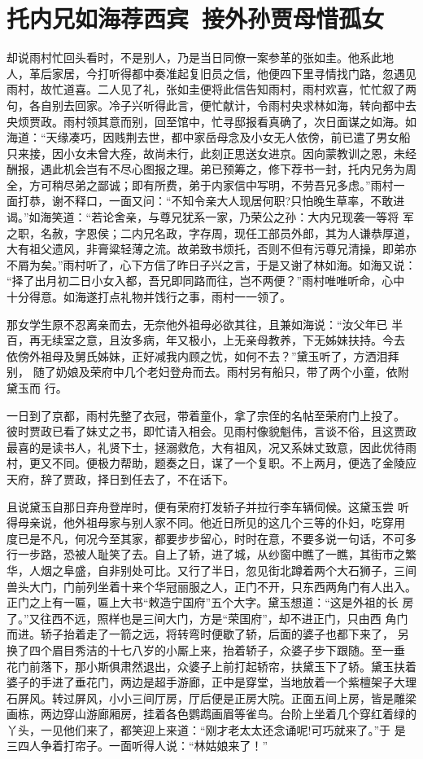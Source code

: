 \chapter{托内兄如海荐西宾~接外孙贾母惜孤女}

却说雨村忙回头看时，不是别人，乃是当日同僚一案参革的张如圭。他系此地
人，革后家居，今打听得都中奏准起复旧员之信，他便四下里寻情找门路，忽遇见
雨村，故忙道喜。二人见了礼，张如圭便将此信告知雨村，雨村欢喜，忙忙叙了两
句，各自别去回家。冷子兴听得此言，便忙献计，令雨村央求林如海，转向都中去
央烦贾政。雨村领其意而别，回至馆中，忙寻邸报看真确了，次日面谋之如海。如
海道：“天缘凑巧，因贱荆去世，都中家岳母念及小女无人依傍，前已遣了男女船
只来接，因小女未曾大痊，故尚未行，此刻正思送女进京。因向蒙教训之恩，未经
酬报，遇此机会岂有不尽心图报之理。弟已预筹之，修下荐书一封，托内兄务为周
全，方可稍尽弟之鄙诚；即有所费，弟于内家信中写明，不劳吾兄多虑。”雨村一
面打恭，谢不释口，一面又问：“不知令亲大人现居何职?只怕晚生草率，不敢进
谒。”如海笑道：“若论舍亲，与尊兄犹系一家，乃荣公之孙：大内兄现袭一等将
军之职，名赦，字恩侯；二内兄名政，字存周，现任工部员外郎，其为人谦恭厚道，
大有祖父遗风，非膏粱轻薄之流。故弟致书烦托，否则不但有污尊兄清操，即弟亦
不屑为矣。”雨村听了，心下方信了昨日子兴之言，于是又谢了林如海。如海又说：
“择了出月初二日小女入都，吾兄即同路而往，岂不两便？”雨村唯唯听命，心中
十分得意。如海遂打点礼物并饯行之事，雨村一一领了。

那女学生原不忍离亲而去，无奈他外祖母必欲其往，且兼如海说：“汝父年已
半百，再无续室之意，且汝多病，年又极小，上无亲母教养，下无姊妹扶持。今去
依傍外祖母及舅氏姊妹，正好减我内顾之忧，如何不去？”黛玉听了，方洒泪拜别，
随了奶娘及荣府中几个老妇登舟而去。雨村另有船只，带了两个小童，依附黛玉而
行。

一日到了京都，雨村先整了衣冠，带着童仆，拿了宗侄的名帖至荣府门上投了。
彼时贾政已看了妹丈之书，即忙请入相会。见雨村像貌魁伟，言谈不俗，且这贾政
最喜的是读书人，礼贤下士，拯溺救危，大有祖风，况又系妹丈致意，因此优待雨
村，更又不同。便极力帮助，题奏之日，谋了一个复职。不上两月，便选了金陵应
天府，辞了贾政，择日到任去了，不在话下。

且说黛玉自那日弃舟登岸时，便有荣府打发轿子并拉行李车辆伺候。这黛玉尝
听得母亲说，他外祖母家与别人家不同。他近日所见的这几个三等的仆妇，吃穿用
度已是不凡，何况今至其家，都要步步留心，时时在意，不要多说一句话，不可多
行一步路，恐被人耻笑了去。自上了轿，进了城，从纱窗中瞧了一瞧，其街市之繁
华，人烟之阜盛，自非别处可比。又行了半日，忽见街北蹲着两个大石狮子，三间
兽头大门，门前列坐着十来个华冠丽服之人，正门不开，只东西两角门有人出入。
正门之上有一匾，匾上大书“敕造宁国府”五个大字。黛玉想道：“这是外祖的长
房了。”又往西不远，照样也是三间大门，方是“荣国府”，却不进正门，只由西
角门而进。轿子抬着走了一箭之远，将转弯时便歇了轿，后面的婆子也都下来了，
另换了四个眉目秀洁的十七八岁的小厮上来，抬着轿子，众婆子步下跟随。至一垂
花门前落下，那小斯俱肃然退出，众婆子上前打起轿帘，扶黛玉下了轿。黛玉扶着
婆子的手进了垂花门，两边是超手游廊，正中是穿堂，当地放着一个紫檀架子大理
石屏风。转过屏风，小小三间厅房，厅后便是正房大院。正面五间上房，皆是雕梁
画栋，两边穿山游廊厢房，挂着各色鹦鹉画眉等雀鸟。台阶上坐着几个穿红着绿的
丫头，一见他们来了，都笑迎上来道：“刚才老太太还念诵呢!可巧就来了。”于
是三四人争着打帘子。一面听得人说：“林姑娘来了！”

